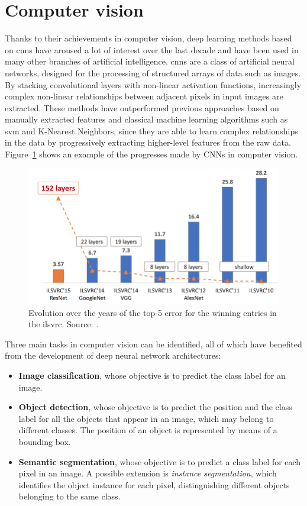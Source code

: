\documentclass[%
    corpo=12pt,
    twoside,
    stile=classica,   
    tipotesi=magistrale,
    evenboxes,
    english,
	numerazioneromana,
]{toptesi}
\begin{document}
\section{Computer vision}
Thanks to their achievements in computer vision, deep learning methods based on \glspl{cnn} have aroused a lot of interest over the last decade and have been used in many other branches of artificial intelligence. \Glspl{cnn} are a class of artificial neural networks, designed for the processing of structured arrays of data such as images. By stacking convolutional layers with non-linear activation functions, increasingly complex non-linear relationships between adjacent pixels in input images are extracted. These methods have outperformed previous approaches based on manually extracted features and classical machine learning algorithms such as \gls{svm} and K-Nearest Neighbors, since they are able to learn complex relationships in the data by progressively extracting higher-level features from the raw data. Figure~\ref{fig:imagenet} shows an example of the progresses made by CNNs in computer vision.

\begin{figure}[ht]
	\centering
	\includegraphics[width=.7\textwidth]{imgs/ILSVRC.png}
	\caption[Evolution of top-5 error for the winning entries in \gls{ilsvrc}]{Evolution over the years of the top-5 error for the winning entries in the \gls{ilsvrc}\cite{russakovsky2015imagenet}. Source: \cite{hanqing2020research}.
	\label{fig:imagenet}}
\end{figure}

Three main tasks in computer vision can be identified, all of which have benefited from the development of deep neural network architectures:

\begin{itemize}
	\item \textbf{Image classification}, whose objective is to predict the class label for an image.
	\item \textbf{Object detection}, whose objective is to predict the position and the class label for all the objects that appear in an image, which may belong to different classes. The position of an object is represented by means of a bounding box.
	\item \textbf{Semantic segmentation}, whose objective is to predict a class label for each pixel in an image. A possible extension is \textit{instance segmentation}, which identifies the object instance for each pixel, distinguishing different objects belonging to the same class.
\end{itemize}
\end{document}
